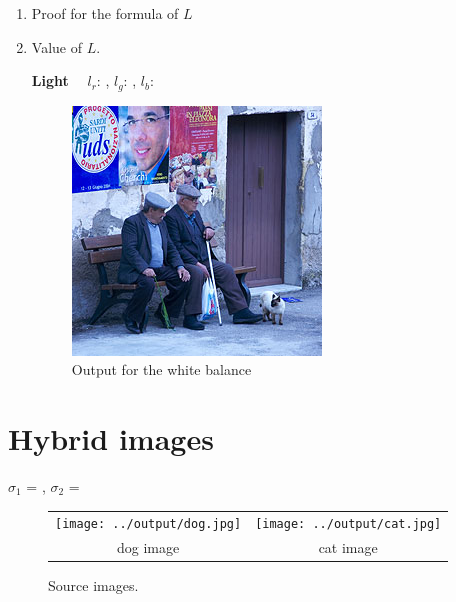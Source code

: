 \documentclass[10pt,letterpaper]{article}
\begin{document}
\begin{enumerate}
\item Proof for the formula of $L$
\vspace{5in}
\item Value of $L$.

\textbf{Light}~~ $l_r$: \underline{\hspace{2cm}}, $l_g$: \underline{\hspace{3cm}}, $l_b$:\underline{\hspace{3cm}}

\begin{figure}[h]
\includegraphics[width=\linewidth]{../data/wb_sardmen-incorrect.jpg}
\caption{Output for the white balance}
\end{figure}

\end{enumerate}

\newpage
\section{Hybrid images} 

$\sigma_1$ = \underline{\hspace{2cm}}, $\sigma_2$ = \underline{\hspace{2cm}}
\begin{figure}[h]
\begin{tabular}{cc}
\texttt{[image: ../output/dog.jpg]} &
\texttt{[image: ../output/cat.jpg]} \\
dog image & cat image  \\
\end{tabular}
\caption{\label{fig:source} Source images.}
\end{figure}
\end{document}
